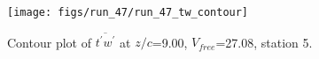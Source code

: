 \begin{figure}[H]
\centering
\texttt{[image: figs/run\_47/run\_47\_tw\_contour]}
\caption{Contour plot of $\overline{t^\prime w^\prime}$ at $z/c$=9.00, $V_{free}$=27.08, station 5.}
\label{fig:run_47_tw_contour}
\end{figure}


